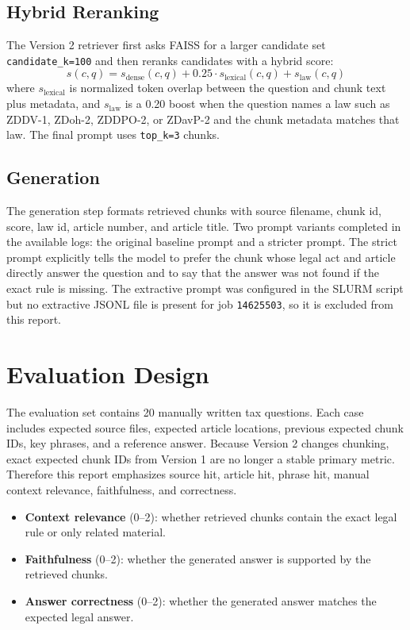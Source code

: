 \documentclass[11pt,a4paper]{article}
\newcommand{\metric}[1]{\textbf{#1}}
\begin{document}
\subsection{Hybrid Reranking}
The Version 2 retriever first asks FAISS for a larger candidate set \texttt{candidate\_k=100} and then reranks candidates with a hybrid score:
\[
s(c, q) = s_{\mathrm{dense}}(c, q) + 0.25 \cdot s_{\mathrm{lexical}}(c, q) + s_{\mathrm{law}}(c, q)
\]
where $s_{\mathrm{lexical}}$ is normalized token overlap between the question and chunk text plus metadata, and $s_{\mathrm{law}}$ is a 0.20 boost when the question names a law such as ZDDV-1, ZDoh-2, ZDDPO-2, or ZDavP-2 and the chunk metadata matches that law. The final prompt uses \texttt{top\_k=3} chunks.
\subsection{Generation}
The generation step formats retrieved chunks with source filename, chunk id, score, law id, article number, and article title. Two prompt variants completed in the available logs: the original baseline prompt and a stricter prompt. The strict prompt explicitly tells the model to prefer the chunk whose legal act and article directly answer the question and to say that the answer was not found if the exact rule is missing. The extractive prompt was configured in the SLURM script but no extractive JSONL file is present for job \texttt{14625503}, so it is excluded from this report.
\section{Evaluation Design}
The evaluation set contains 20 manually written tax questions. Each case includes expected source files, expected article locations, previous expected chunk IDs, key phrases, and a reference answer. Because Version 2 changes chunking, exact expected chunk IDs from Version 1 are no longer a stable primary metric. Therefore this report emphasizes source hit, article hit, phrase hit, manual context relevance, faithfulness, and correctness.
\begin{itemize}[leftmargin=*]
\item \metric{Context relevance} (0--2): whether retrieved chunks contain the exact legal rule or only related material.
\item \metric{Faithfulness} (0--2): whether the generated answer is supported by the retrieved chunks.
\item \metric{Answer correctness} (0--2): whether the generated answer matches the expected legal answer.
\end{itemize}
\end{document}
